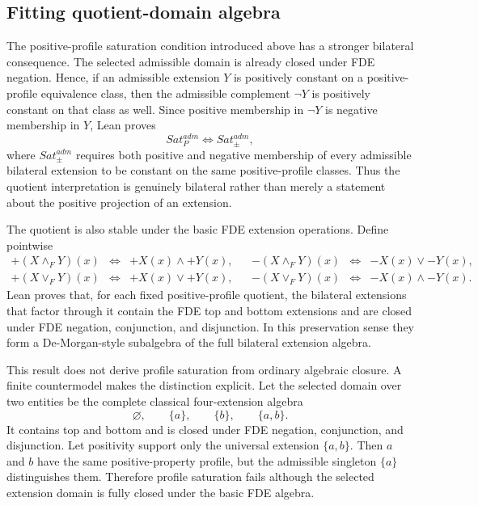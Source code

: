 \subsection{Fitting quotient-domain algebra}
\label{sec:fitting-domain-algebra}

The positive-profile saturation condition introduced above has a stronger bilateral consequence. The selected admissible domain is already closed under FDE negation. Hence, if an admissible extension \(Y\) is positively constant on a positive-profile equivalence class, then the admissible complement \(\neg Y\) is positively constant on that class as well. Since positive membership in \(\neg Y\) is negative membership in \(Y\), Lean proves
\[
  Sat_P^{adm}\Longleftrightarrow Sat_{\pm}^{adm},
\]
where \(Sat_{\pm}^{adm}\) requires both positive and negative membership of every admissible bilateral extension to be constant on the same positive-profile classes. Thus the quotient interpretation is genuinely bilateral rather than merely a statement about the positive projection of an extension.

The quotient is also stable under the basic FDE extension operations. Define pointwise
\[
\begin{array}{rclcrcl}
 +(X\wedge_FY)(x)&\Leftrightarrow&+X(x)\land+Y(x),&&
 -(X\wedge_FY)(x)&\Leftrightarrow&-X(x)\lor-Y(x),\\
 +(X\vee_FY)(x)&\Leftrightarrow&+X(x)\lor+Y(x),&&
 -(X\vee_FY)(x)&\Leftrightarrow&-X(x)\land-Y(x).
\end{array}
\]
Lean proves that, for each fixed positive-profile quotient, the bilateral extensions that factor through it contain the FDE top and bottom extensions and are closed under FDE negation, conjunction, and disjunction. In this preservation sense they form a De-Morgan-style subalgebra of the full bilateral extension algebra.

This result does not derive profile saturation from ordinary algebraic closure. A finite countermodel makes the distinction explicit. Let the selected domain over two entities be the complete classical four-extension algebra
\[
  \varnothing,\qquad\{a\},\qquad\{b\},\qquad\{a,b\}.
\]
It contains top and bottom and is closed under FDE negation, conjunction, and disjunction. Let positivity support only the universal extension \(\{a,b\}\). Then \(a\) and \(b\) have the same positive-property profile, but the admissible singleton \(\{a\}\) distinguishes them. Therefore profile saturation fails although the selected extension domain is fully closed under the basic FDE algebra.

